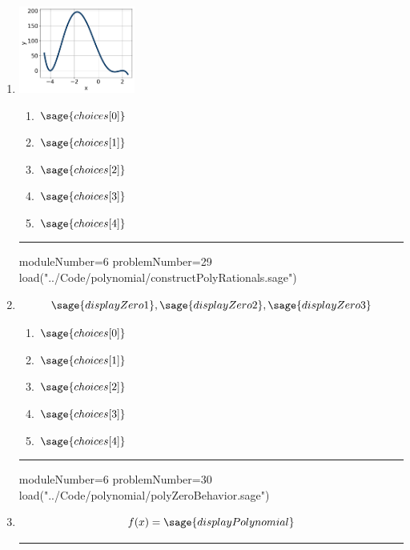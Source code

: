 \documentclass[14pt]{article}
\newcommand{\litem}[1]{\item#1\hspace*{-1cm}\rule{\textwidth}{0.4pt}}
\begin{document}
\begin{enumerate}
\litem{ 

	\begin{center}
	\includegraphics[width = 0.3\textwidth]{../Figures/polyGraphToFunctionC.png}
	\end{center}

	\begin{enumerate}[label=\Alph*.]
		\item \( \sage{choices[0]} \)
		\item \( \sage{choices[1]} \)
		\item \( \sage{choices[2]} \)
		\item \( \sage{choices[3]} \)
		\item \( \sage{choices[4]} \)
	\end{enumerate}
}

\begin{sagesilent}
moduleNumber=6
problemNumber=29
load("../Code/polynomial/constructPolyRationals.sage")
\end{sagesilent}

\litem{ 

	\[ \sage{displayZero1}, \sage{displayZero2}, \sage{displayZero3} \]

	\begin{enumerate}[label=\Alph*.]
		\item \( \sage{choices[0]} \)
		\item \( \sage{choices[1]} \)
		\item \( \sage{choices[2]} \)
		\item \( \sage{choices[3]} \)
		\item \( \sage{choices[4]} \)
	\end{enumerate}
}

\begin{sagesilent}
moduleNumber=6
problemNumber=30
load("../Code/polynomial/polyZeroBehavior.sage")
\end{sagesilent}

\litem{ 

	\[ f(x) = \sage{displayPolynomial} \]

}
\end{enumerate}
\end{document}
